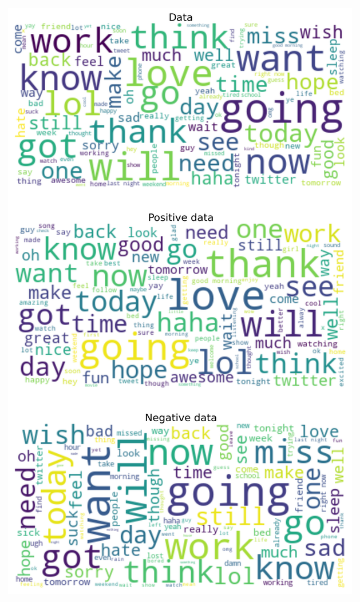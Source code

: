 \documentclass{article}
\begin{document}
\begin{itemize}
\begin{figure}[H]
\begin{subfigure}[b]{0.24\textwidth}
\includegraphics[width=\textwidth]{chapter-06/section-01-01/01/visualization/2/wordcloud.png}
\end{subfigure}
\begin{subfigure}[b]{0.24\textwidth}
\centering

\end{subfigure}
\end{figure}
\end{itemize}
\end{document}
